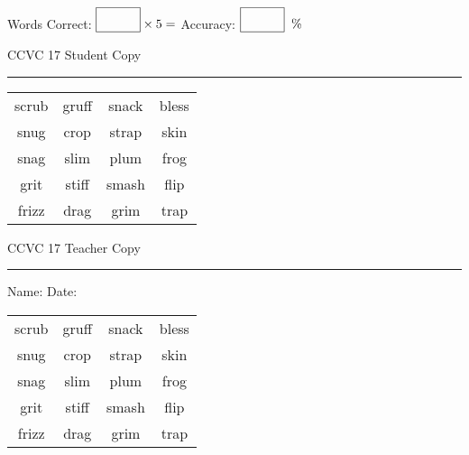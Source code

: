 \documentclass{memoir}
\begin{document}
\normalsize

Words Correct: $\fbox{\phantom{\huge 100}} \times 5 = $ Accuracy: $\fbox{\phantom{\huge 100}}\;\; \%$ 

\vfill

\newpage


\footnotesize \noindent
CCVC 17 \hfill Student Copy
\smallskip
\hrule

\Large

\setlength{\tabcolsep}{14pt}
\def\arraystretch{3}

{\selectfont


\begin{vplace}[0.5]
\begin{center}
\begin{tabular}{cccc}
scrub & gruff & snack & bless \\
snug & crop & strap & skin \\
snag & slim & plum & frog \\
grit      & stiff & smash & flip \\
frizz & drag        & grim       & trap \\
\end{tabular}
\end{center}
\end{vplace}

}

\newpage

\footnotesize \noindent
CCVC 17 \hfill Teacher Copy
\smallskip
\hrule

\normalsize

\vfill

\noindent
Name: \underline{\hspace{1.75in}} \hfill Date: \underline{\hspace{1in}}

\Large

{\selectfont


\begin{vplace}[0.5]
\begin{center}
\begin{tabular}{cccc}
scrub & gruff & snack & bless \\
snug & crop & strap & skin \\
snag & slim & plum & frog \\
grit      & stiff & smash & flip \\
frizz & drag        & grim       & trap \\
\end{tabular}
\end{center}
\end{vplace}



}
\end{document}
